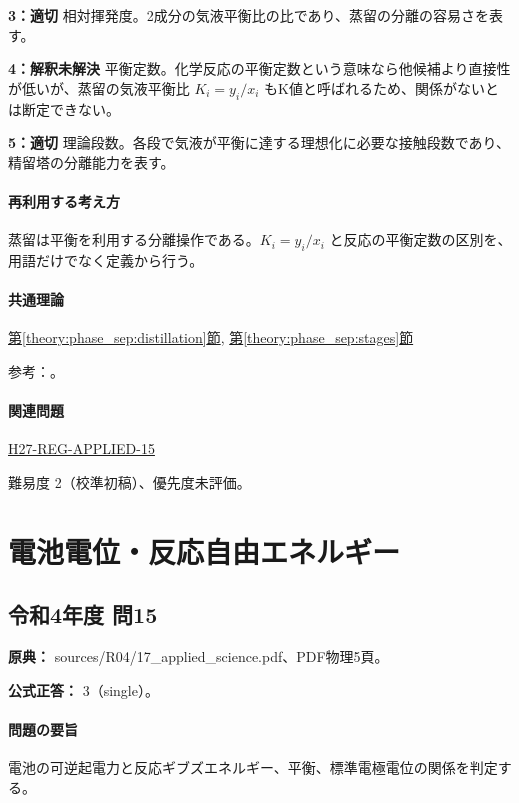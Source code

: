 \noindent\textbf{3：適切} 相対揮発度。2成分の気液平衡比の比であり、蒸留の分離の容易さを表す。\par

\noindent\textbf{4：解釈未解決} 平衡定数。化学反応の平衡定数という意味なら他候補より直接性が低いが、蒸留の気液平衡比 \(K_i=y_i/x_i\) もK値と呼ばれるため、関係がないとは断定できない。\par

\noindent\textbf{5：適切} 理論段数。各段で気液が平衡に達する理想化に必要な接触段数であり、精留塔の分離能力を表す。\par

\paragraph{再利用する考え方} 蒸留は平衡を利用する分離操作である。\(K_i=y_i/x_i\) と反応の平衡定数の区別を、用語だけでなく定義から行う。

\paragraph{共通理論} \hyperref[theory:phase_sep:distillation]{第\ref*{theory:phase_sep:distillation}節}, \hyperref[theory:phase_sep:stages]{第\ref*{theory:phase_sep:stages}節}

\par 参考：\cite{nptel_distillation1}。

\paragraph{関連問題} \hyperref[q:h27-reg-applied-15]{H27-REG-APPLIED-15}

\par 難易度 2（校準初稿）、優先度未評価。

\section{電池電位・反応自由エネルギー}

\subsection{令和4年度 問15}
\label{q:r04-reg-applied-15}

\noindent\textbf{原典：} sources/R04/17\_applied\_science.pdf、PDF物理5頁。

\textbf{公式正答：} 3（single）。

\paragraph{問題の要旨} 電池の可逆起電力と反応ギブズエネルギー、平衡、標準電極電位の関係を判定する。

